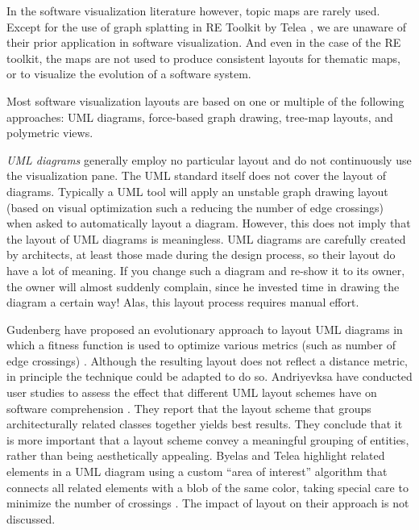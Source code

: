 In the software visualization literature however, topic maps are rarely used.
Except for the use of graph splatting in RE Toolkit by Telea \etal \cite{Tele03a}, we are unaware of their prior application in software visualization. And even in the case of the RE toolkit, the maps are not used to produce consistent layouts for thematic maps, or to visualize the evolution of a software system. 

Most software visualization layouts are based on one or multiple of the following approaches: UML diagrams, force-based graph drawing, tree-map layouts, and polymetric views.

\emph{UML diagrams} generally employ no particular layout and do not continuously use the visualization pane. The UML standard itself does not cover the layout of diagrams. Typically a UML tool will apply an unstable graph drawing layout (\eg based on visual optimization such a reducing the number of edge crossings) when asked to automatically layout a diagram. However, this does not imply that the layout of UML diagrams is meaningless. UML diagrams are carefully created by architects, at least those made during the design process, so their layout do have a lot of meaning. If you change such a diagram and re-show it to its owner, the owner will almost suddenly complain, since he invested time in drawing the diagram a certain way! Alas, this layout process requires manual effort.

Gudenberg \etal have proposed an evolutionary approach to layout UML diagrams in which a fitness function is used to optimize various metrics (such as number of edge crossings) \cite{Gude06a}. Although the resulting layout does not reflect a distance metric, in principle the technique could be adapted to do so. Andriyevksa \etal have conducted user studies to assess the effect that different UML layout schemes have on software comprehension \cite{Andr05a}.
They report that the layout scheme that groups architecturally related classes together yields best results. They conclude that it is more important that a layout scheme convey %
a meaningful grouping of entities, rather than being aesthetically appealing. Byelas and Telea highlight related elements in a UML
diagram using a custom ``area of interest'' algorithm that connects all related elements with a blob of the same color, taking special care to minimize the number of crossings \cite{Byel06a}.
The impact of layout on their approach is not discussed.

